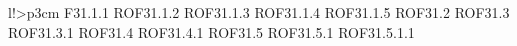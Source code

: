\begin{tabella}{l!{\VRule}>{\centering\arraybackslash}p{3cm}}
F31.1.1 \linebreak ROF31.1.2 \linebreak ROF31.1.3 \linebreak ROF31.1.4 \linebreak ROF31.1.5 \linebreak ROF31.2 \linebreak ROF31.3 \linebreak ROF31.3.1 \linebreak ROF31.4 \linebreak ROF31.4.1 \linebreak ROF31.5 \linebreak ROF31.5.1 \linebreak ROF31.5.1.1 
\end{tabella}
